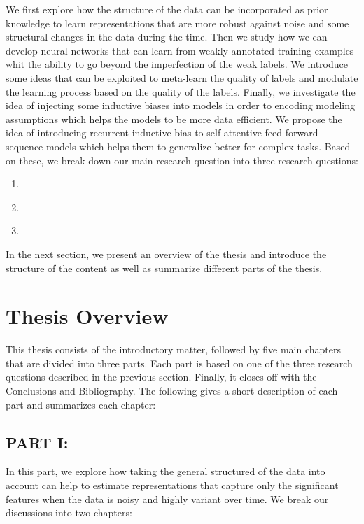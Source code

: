 We first explore how the structure of the data can be incorporated as prior knowledge to learn representations that are more robust against noise and some structural changes in the data during the time. 
%
Then we study how we can develop neural networks that can learn from weakly annotated training examples whit the ability to go beyond the imperfection of the weak labels. We introduce some ideas that can be exploited to meta-learn the quality of labels and modulate the learning process based on the quality of the labels.  
%
Finally, we investigate the idea of injecting some inductive biases into models in order to encoding modeling assumptions which helps the models to be more data efficient. We propose the idea of introducing recurrent inductive bias to self-attentive feed-forward sequence models which helps them to generalize better for complex tasks.  
%
Based on these, we break down our main research question into three research questions:

\begin{resqbox}
\begin{enumerate}
\item[\textbf{\resqname{p1}}] \emph{}
\item[\textbf{\resqname{p2}}] \emph{}
\item[\textbf{\resqname{p3}}] \emph{}
\end{enumerate}
\end{resqbox}

In the next section, we present an overview of the thesis and introduce the structure of the content as well as summarize different parts of the thesis.

\section{Thesis Overview}
This thesis consists of the introductory matter, followed by five main
chapters that are divided into three parts. Each part is based on one of the three research questions described in the previous section. Finally, it closes off with the Conclusions and Bibliography. 
The following gives a short description of each part and summarizes each chapter: 

\subsection*{PART I: }
In this part, we explore how taking the general structured of the data into account can help to estimate representations that capture only the significant features when the data is noisy and highly variant over time. We break our discussions into two chapters:

